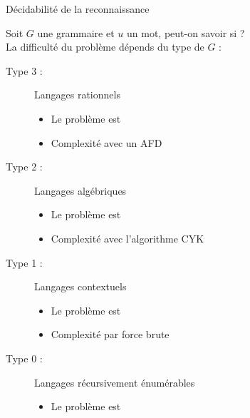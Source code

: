 
\begingroup

\begin{frame}{Décidabilité de la reconnaissance}

  Soit $G$ une grammaire et $u$ un mot, peut-on savoir si  ?\\
  La difficulté du problème dépends du type de $G$ :
 
  \begin{description}
  \item[Type 3 :] Langages rationnels
    \begin{itemize}
    \item Le problème est 
    \item Complexité  avec un AFD
    \end{itemize}
  \item[Type 2 :] Langages algébriques
    \begin{itemize}
    \item Le problème est 
    \item Complexité  avec l'algorithme CYK
    \end{itemize}
  \item[Type 1 :] Langages contextuels
    \begin{itemize}
    \item Le problème est 
    \item Complexité  par force brute
    \end{itemize}
  \item[Type 0 :] Langages récursivement énumérables
    \begin{itemize}
    \item Le problème est 
    \end{itemize}
  \end{description}
 
\end{frame}

\endgroup
